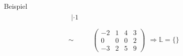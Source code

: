 \documentclass{article}
\begin{document}
\begin{boxx}[DarkBlue]{Beispiel}
\begin{align*}
\begin{array}{ll}
             |\cdot 1& \\
             &
        \end{array} \\
        \sim&\left( \begin{array}{ccc|c} -2 & 1 & 4 & 3 \\ 0 & 0 & 0 & 2 \\ -3 & 2 & 5 & 9 \end{array} \right) \begin{array}{ll}
             & \\
             \Rightarrow \mathbb{L} = \{\}& \\
             &
        \end{array} \\
    \end{align*}
\end{boxx}
\end{document}

